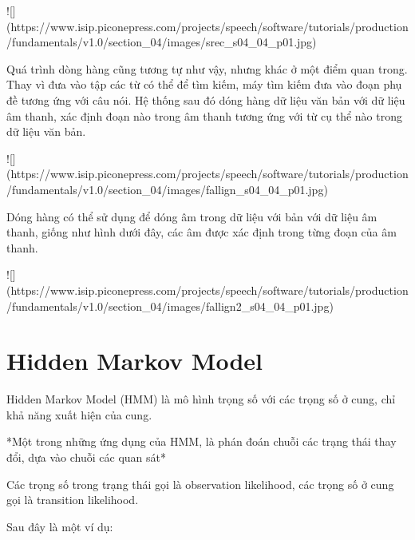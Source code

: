 ![](https://www.isip.piconepress.com/projects/speech/software/tutorials/production/fundamentals/v1.0/section_04/images/srec_s04_04_p01.jpg)

Quá trình dòng hàng cũng tương tự như vậy, nhưng khác ở một điểm quan trong. Thay vì đưa vào tập các từ có thể để tìm kiếm, máy tìm kiếm đưa vào đoạn phụ đề tương ứng với câu nói. Hệ thống sau đó dóng hàng dữ liệu văn bản với dữ liệu âm thanh, xác định đoạn nào trong âm thanh tương ứng với từ cụ thể nào trong dữ liệu văn bản.

![](https://www.isip.piconepress.com/projects/speech/software/tutorials/production/fundamentals/v1.0/section_04/images/fallign_s04_04_p01.jpg)

Dóng hàng có thể sử dụng để dóng âm trong dữ liệu với bản với dữ liệu âm thanh, giống như hình dưới đây, các âm được xác định trong từng đoạn của âm thanh.

![](https://www.isip.piconepress.com/projects/speech/software/tutorials/production/fundamentals/v1.0/section_04/images/fallign2_s04_04_p01.jpg)

\section{Hidden Markov Model}

Hidden Markov Model (HMM) là mô hình trọng số với các trọng số ở cung, chỉ khả năng xuất hiện của cung.

*Một trong những ứng dụng của HMM, là phán đoán chuỗi các trạng thái thay đổi, dựa vào chuỗi các quan sát*

Các trọng số trong trạng thái gọi là observation likelihood, các trọng số ở cung gọi là transition likelihood.

Sau đây là một ví dụ:


